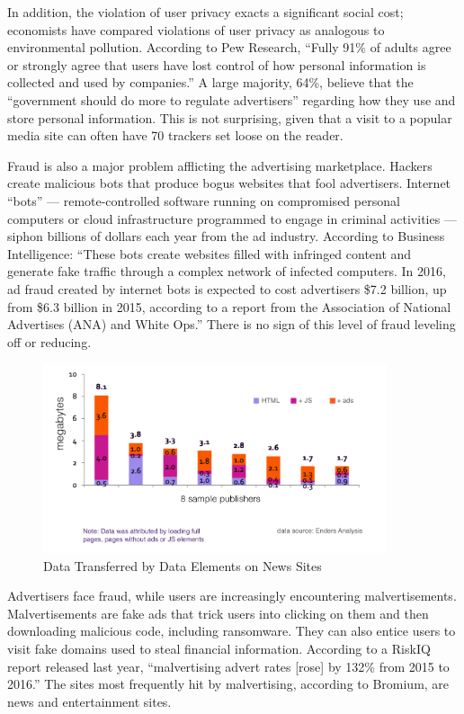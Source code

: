 \documentclass[11pt]{article}
\begin{document}
In addition, the violation of user privacy exacts a significant social cost; economists have compared violations of user privacy as analogous to environmental pollution.\cite{5} According to Pew Research, “Fully 91\% of adults agree or strongly agree that users have lost control of how personal information is collected and used by companies.”\cite{6} A large majority, 64\%, believe that the “government should do more to regulate advertisers” regarding how they use and store personal information. This is not surprising, given that a visit to a popular media site can often have 70 trackers set loose on the reader. 

Fraud is also a major problem afflicting the advertising marketplace. Hackers  create malicious bots that produce bogus websites that fool advertisers. Internet “bots” — remote-controlled software running on compromised personal computers or cloud infrastructure programmed to engage in criminal activities — siphon billions of dollars each year from the ad industry. According to Business Intelligence: “These bots create websites filled with infringed content and generate fake traffic through a complex network of infected computers. In 2016, ad fraud created by internet bots is expected to cost advertisers \$7.2 billion, up from \$6.3 billion in 2015, according to a report from the Association of National Advertises (ANA) and White Ops.”\cite{7} There is no sign of this level of fraud leveling off or reducing. 

\begin{figure}
\begin{center}
\includegraphics[width=0.9\textwidth]{data_transfer_news_sites.png}
\caption{Data Transferred by Data Elements on News Sites}
\end{center}
\end{figure}



Advertisers face fraud, while users are increasingly encountering malvertisements. Malvertisements are fake ads that trick users into clicking on them and then downloading malicious code, including ransomware. They can also entice users to visit fake domains used to steal financial information. According to a RiskIQ report released last year, “malvertising advert rates [rose] by 132\% from 2015 to 2016.” The sites most frequently hit by malvertising, according to Bromium\cite{8}, are news and entertainment sites. 
\end{document}
